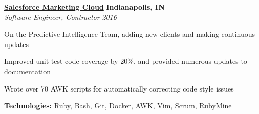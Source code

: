 %
    \headerrow
        {\textbf{\href{https://www.marketingcloud.com/}{Salesforce Marketing Cloud}}}
        {\textbf{Indianapolis, IN}}
    \\
    \headerrow
        {\emph{Software Engineer, Contractor}}
        {\emph{2016}}
    \begin{itemize*}
        \item On the Predictive Intelligence Team, adding new clients and making continuous updates
        \item Improved unit test code coverage by 20\%, and provided numerous updates to documentation
        \item Wrote over 70 AWK scripts for automatically correcting code style issues
    \end{itemize*}

    \hspace{1.0em}
    \textbf{Technologies:} Ruby, Bash, Git, Docker, AWK, Vim, Scrum, RubyMine

